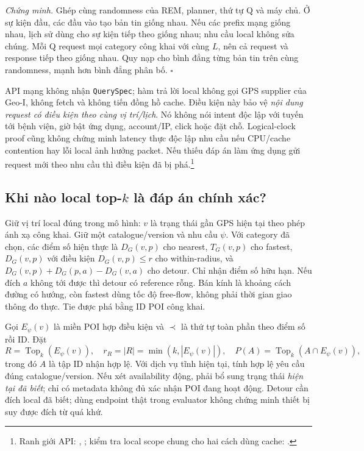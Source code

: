 \noindent\emph{Chứng minh.}
Ghép cùng randomness của REM, planner, thứ tự Q và máy chủ. Ở sự kiện
đầu, các đầu vào tạo bản tin giống nhau. Nếu các prefix mạng giống nhau,
lịch sử dùng cho sự kiện tiếp theo giống nhau; nhu cầu local không sửa
chúng. Mỗi Q request mọi category công khai với cùng $L$, nên cả request
và response tiếp theo giống nhau. Quy nạp cho bình đẳng từng bản tin
trên cùng randomness, mạnh hơn bình đẳng phân bố. \hfill$\square$

API mạng không nhận \texttt{QuerySpec}; hàm trả lời local không gọi GPS
supplier của Geo-I, không fetch và không tiến đồng hồ cache. Điều kiện
này bảo vệ \emph{nội dung request có điều kiện theo cùng vị trí/lịch}.
Nó không nói intent độc lập với tuyến tới bệnh viện, giờ bật ứng dụng,
account/IP, click hoặc đặt chỗ. Logical-clock proof cũng không chứng
minh latency thực độc lập nhu cầu nếu CPU/cache contention hay lỗi local
ảnh hưởng packet. Nếu thiếu đáp án làm ứng dụng gửi request mới theo
nhu cầu thì điều kiện đã bị phá.\footnote{Ranh giới API:
,
; kiểm tra local scope chung cho
hai cách dùng cache: .}

\subsection{Khi nào local top-$k$ là đáp án chính xác?}
\label{sec:formal-service-local-exactness}

Giữ vị trí local đúng trong mô hình: $v$ là trạng thái gần GPS hiện tại
theo phép ánh xạ công khai. Giữ một catalogue/version và nhu cầu $\psi$.
Với category đã chọn, các điểm số hiện thực là $D_G(v,p)$ cho nearest,
$T_G(v,p)$ cho fastest, $D_G(v,p)$ với điều kiện $D_G(v,p)\leq r$ cho
within-radius, và
$D_G(v,p)+D_G(p,a)-D_G(v,a)$ cho detour. Chỉ nhận điểm số hữu hạn.
Nếu đích $a$ không tới được thì detour có reference rỗng. Bán kính là
khoảng cách đường có hướng, còn fastest dùng tốc độ free-flow, không
phải thời gian giao thông đo thực. Tie được phá bằng ID POI công khai.

Gọi $E_\psi(v)$ là miền POI hợp điều kiện và $\prec$ là thứ tự toàn phần
theo điểm số rồi ID. Đặt
\begin{equation}
 R=\operatorname{Top}_k(E_\psi(v)),\quad
 r_R=|R|=\min(k,|E_\psi(v)|),\quad
 P(A)=\operatorname{Top}_k(A\cap E_\psi(v)),
 \label{eq:formal-service-reference}
\end{equation}
trong đó $A$ là tập ID nhận hợp lệ. Với dịch vụ tĩnh hiện tại, tính hợp lệ
yêu cầu đúng catalogue/version. Nếu xét availability động, phải bổ sung
trạng thái \emph{hiện tại đã biết}; chỉ có metadata không đủ xác nhận POI
đang hoạt động. Detour cần đích local đã biết; dùng endpoint thật trong
evaluator không chứng minh thiết bị suy được đích từ quá khứ.

